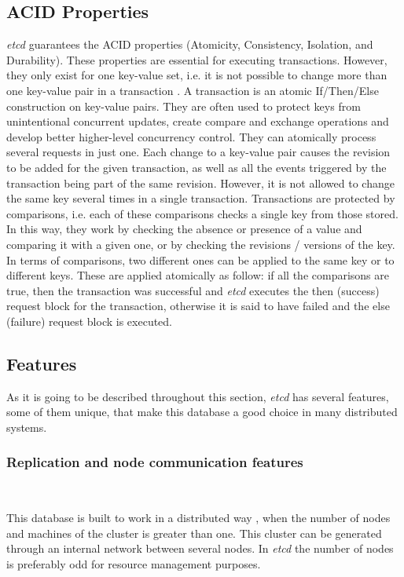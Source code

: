 \documentclass[screen,review]{acmart}
\begin{document}
\subsection{ACID Properties}
\textit{etcd} guarantees the ACID properties \cite{acid} (Atomicity, Consistency, Isolation, and Durability). These properties are essential for executing transactions. However, they only exist for one key-value set, i.e. it is not possible to change more than one key-value pair in a transaction \cite{transaction}.
A transaction is an atomic If/Then/Else construction on key-value pairs. They are often used to protect keys from unintentional concurrent updates, create compare and exchange operations and develop better higher-level concurrency control.
They can atomically process several requests in just one. Each change to a key-value pair causes the revision to be added for the given transaction, as well as all the events triggered by the transaction being part of the same revision. However, it is not allowed to change the same key several times in a single transaction.
Transactions are protected by comparisons, i.e. each of these comparisons checks a single key from those stored. In this way, they work by checking the absence or presence of a value and comparing it with a given one, or by checking the revisions / versions of the key. In terms of comparisons, two different ones can be applied to the same key or to different keys.
These are applied atomically as follow: if all the comparisons are true, then the transaction was successful and \textit{etcd} executes the then (success) request block for the transaction, otherwise it is said to have failed and the else (failure) request block is executed.


\subsection{Features}

As it is going to be described throughout this section, \textit{etcd} has several features, some of them unique, that make this database a good choice in many distributed systems.\\

\subsubsection{Replication and node communication features}~\

This database is built to work in a distributed way \cite{etcd_clustering}, when the number of nodes and machines of the cluster is greater than one. This cluster can be generated through an internal network between several nodes. In \textit{etcd} the number of nodes is preferably odd for resource management purposes.
\end{document}
